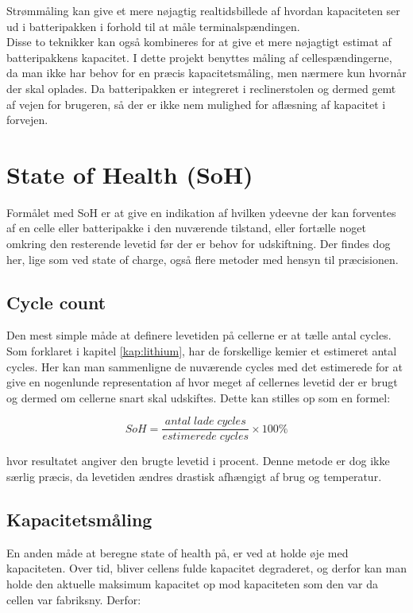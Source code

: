 Strømmåling kan give et mere nøjagtig realtidsbillede af hvordan kapaciteten ser ud i batteripakken i forhold til at måle terminalspændingen.
\\

Disse to teknikker kan også kombineres for at give et mere nøjagtigt estimat af batteripakkens kapacitet. I dette projekt benyttes måling af cellespændingerne, da man ikke har behov for en præcis kapacitetsmåling, men nærmere kun hvornår der skal oplades. Da batteripakken er integreret i reclinerstolen og dermed gemt af vejen for brugeren, så der er ikke nem mulighed for aflæsning af kapacitet i forvejen. 

\section{State of Health (SoH)}
Formålet med SoH er at give en indikation af hvilken ydeevne der kan forventes af en celle eller batteripakke i den nuværende tilstand, eller fortælle noget omkring den resterende levetid før der er behov for udskiftning. Der findes dog her, lige som ved state of charge, også flere metoder med hensyn til præcisionen. 

\subsection{Cycle count}
Den mest simple måde at definere levetiden på cellerne er at tælle antal cycles. Som forklaret i kapitel \ref{kap:lithium}, har de forskellige kemier et estimeret antal cycles. Her kan man sammenligne de nuværende cycles med det estimerede for at give en nogenlunde representation af hvor meget af cellernes levetid der er brugt og dermed om cellerne snart skal udskiftes. Dette kan stilles op som en formel: 

\begin {equation} 
SoH = \frac{antal \; lade \; cycles}{estimerede \; cycles}\times 100\percent \label{eq:soh_cycles}
\end {equation}

hvor resultatet angiver den brugte levetid i procent. Denne metode er dog ikke særlig præcis, da levetiden ændres drastisk afhængigt af brug og temperatur. 

\subsection{Kapacitetsmåling}
En anden måde at beregne state of health på, er ved at holde øje med kapaciteten. Over tid, bliver cellens fulde kapacitet degraderet, og derfor kan man holde den aktuelle maksimum kapacitet op mod kapaciteten som den var da cellen var fabriksny. Derfor: 

